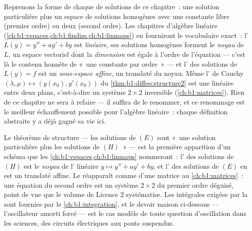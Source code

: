 \begin{remark}\label{rem:b1:diffeq:interlude}
Reprenons la forme de chaque  de solutions de ce chapitre~:
une solution particulière plus un espace de solutions homogènes avec
une constante libre (premier ordre) ou deux (second ordre). Les
chapitres d'algèbre linéaire
(\cref{ch:b1:vspaces,ch:b1:findim,ch:b1:linmaps}) en fourniront le
vocabulaire exact~: l' $L(y) = y'' + ay' + by$ est
\emph{linéaire}, ses solutions homogènes forment le \emph{noyau} de
$L$, un espace vectoriel dont la \emph{dimension} est égale à l'ordre
de l'équation --- c'est là le contenu honnête de «~une constante par
ordre~» --- et l' des solutions de $L(y) = f$ est un
\emph{sous-espace affine}, un translaté du noyau. Même l' de
Cauchy $(\lambda, \mu) \mapsto (y(x_0), y'(x_0))$ du
\cref{thm:b1:diffeq:structure2} est une  linéaire entre deux
plans, c'est-à-dire un système $2 \times 2$ inversible
(\cref{ch:b1:matrices}). Rien de ce chapitre ne sera à refaire --- il
suffira de le renommer, et ce renommage est le meilleur échauffement
possible pour l'algèbre linéaire~: chaque définition abstraite y a
déjà gagné sa vie ici.
\end{remark}

\begin{remark}\label{rem:b1:diffeq:whereused}
Le théorème de structure --- les solutions de $(E)$ sont «~une
solution particulière plus les solutions de $(H)$~» --- est la
première apparition d'un schéma que les \cref{ch:b1:vspaces,ch:b1:linmaps}
nommeront~: l' des solutions de $(H)$ est le \emph{noyau} de
l' linéaire $y \mapsto y'' + ay' + by$, et l' des
solutions de $(E)$ en est un translaté affine. Le  réapparaît comme  d'une matrice
au \cref{ch:b1:matrices}~: une équation du second ordre est un système
$2 \times 2$ du premier ordre déguisé, point de vue que le volume de
Licence 2 systématise. Les intégrales exigées par la  sont fournies par le \cref{ch:b1:integration}, et le devoir
maison ci-dessous --- l'oscillateur amorti forcé --- est le cas modèle
de toute question d'oscillation dans les sciences, des circuits
électriques aux ponts suspendus.
\end{remark}

